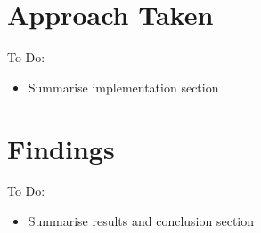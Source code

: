 \section{Approach Taken}

\color{red}
To Do:
\begin{itemize}
	\item Summarise implementation section
\end{itemize}
\color{black}

\section{Findings}

\color{red}
To Do:
\begin{itemize}
	\item Summarise results and conclusion section
\end{itemize}
\color{black}
